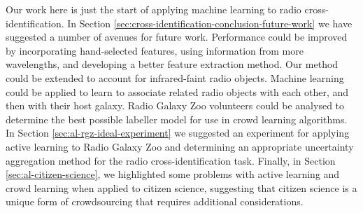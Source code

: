     Our work here is just the start of applying machine learning to radio
    cross-identification. In Section
    \ref{sec:cross-identification-conclusion-future-work} we have suggested a
    number of avenues for future work. Performance could be improved by
    incorporating hand-selected features, using information from more
    wavelengths, and developing a better feature extraction method. Our method
    could be extended to account for infrared-faint radio objects. Machine
    learning could be applied to learn to associate related radio objects with
    each other, and then with their host galaxy. Radio Galaxy Zoo volunteers
    could be analysed to determine the best possible labeller model for use in
    crowd learning algorithms. In Section \ref{sec:al-rgz-ideal-experiment} we
    suggested an experiment for applying active learning to Radio Galaxy Zoo and
    determining an appropriate uncertainty aggregation method for the radio
    cross-identification task. Finally, in Section \ref{sec:al-citizen-science},
    we highlighted some problems with active learning and crowd learning when
    applied to citizen science, suggesting that citizen science is a unique form
    of crowdsourcing that requires additional considerations.
